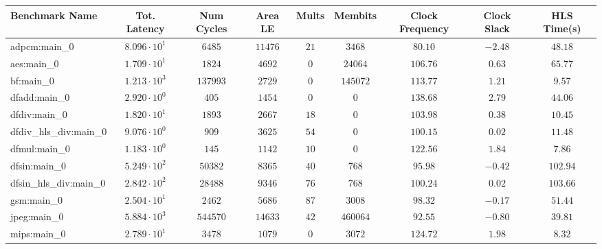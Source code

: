 \begin{tabular}{|l|c|c|c|c|c|c|c|c|}
\hline
Benchmark Name          & Tot. Latency           & Num Cycles & Area LE   & Mults   & Membits    & Clock Frequency & Clock Slack & HLS Time(s) \\
\hline
adpcm:main\_0           & $ 8.096 \cdot 10^{1} $ & $ 6485   $ & $ 11476 $ & $ 21  $ & $ 3468   $ & $ 80.10       $ & $ -2.48   $ & $ 48.18   $ \\
aes:main\_0             & $ 1.709 \cdot 10^{1} $ & $ 1824   $ & $ 4692  $ & $ 0   $ & $ 24064  $ & $ 106.76      $ & $ 0.63    $ & $ 65.77   $ \\
bf:main\_0              & $ 1.213 \cdot 10^{3} $ & $ 137993 $ & $ 2729  $ & $ 0   $ & $ 145072 $ & $ 113.77      $ & $ 1.21    $ & $ 9.57    $ \\
dfadd:main\_0           & $ 2.920 \cdot 10^{0} $ & $ 405    $ & $ 1454  $ & $ 0   $ & $ 0      $ & $ 138.68      $ & $ 2.79    $ & $ 44.06   $ \\
dfdiv:main\_0           & $ 1.820 \cdot 10^{1} $ & $ 1893   $ & $ 2667  $ & $ 18  $ & $ 0      $ & $ 103.98      $ & $ 0.38    $ & $ 10.45   $ \\
dfdiv\_hls\_div:main\_0 & $ 9.076 \cdot 10^{0} $ & $ 909    $ & $ 3625  $ & $ 54  $ & $ 0      $ & $ 100.15      $ & $ 0.02    $ & $ 11.48   $ \\
dfmul:main\_0           & $ 1.183 \cdot 10^{0} $ & $ 145    $ & $ 1142  $ & $ 10  $ & $ 0      $ & $ 122.56      $ & $ 1.84    $ & $ 7.86    $ \\
dfsin:main\_0           & $ 5.249 \cdot 10^{2} $ & $ 50382  $ & $ 8365  $ & $ 40  $ & $ 768    $ & $ 95.98       $ & $ -0.42   $ & $ 102.94  $ \\
dfsin\_hls\_div:main\_0 & $ 2.842 \cdot 10^{2} $ & $ 28488  $ & $ 9346  $ & $ 76  $ & $ 768    $ & $ 100.24      $ & $ 0.02    $ & $ 103.66  $ \\
gsm:main\_0             & $ 2.504 \cdot 10^{1} $ & $ 2462   $ & $ 5686  $ & $ 87  $ & $ 3008   $ & $ 98.32       $ & $ -0.17   $ & $ 51.44   $ \\
jpeg:main\_0            & $ 5.884 \cdot 10^{3} $ & $ 544570 $ & $ 14633 $ & $ 42  $ & $ 460064 $ & $ 92.55       $ & $ -0.80   $ & $ 39.81   $ \\
mips:main\_0            & $ 2.789 \cdot 10^{1} $ & $ 3478   $ & $ 1079  $ & $ 0   $ & $ 3072   $ & $ 124.72      $ & $ 1.98    $ & $ 8.32    $ \\

\end{tabular}
